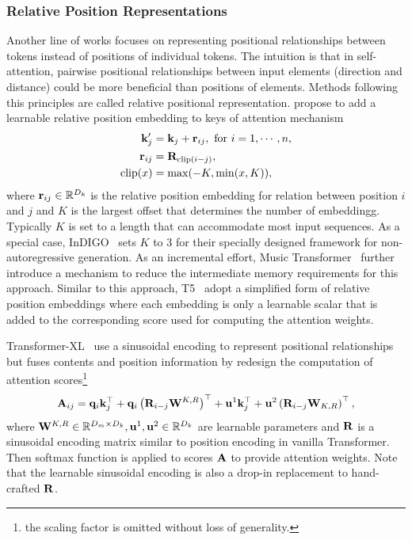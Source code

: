 \documentclass[manuscript,acmsmall,screen,nonacm]{acmart}
\theoremstyle{definition}
\begin{document}
\subsubsection{Relative Position Representations}

Another line of works focuses on representing positional relationships between tokens instead of positions of individual tokens. The intuition is that in self-attention, pairwise positional relationships between input elements (direction and distance) could be more beneficial than positions of elements. Methods following this principles are called relative positional representation. \citet{shaw2018relative} propose to add a learnable relative position embedding to keys of attention mechanism
\begin{align}
    \mathbf{k}_j' &= \mathbf{k}_j + \mathbf{r}_{ij},\ \text{for }i=1,\cdots, n,\\
    \mathbf{r}_{ij} &= \mathbf{R}_{\mathrm{clip}(i-j)}\label{rij},\\
    \mathrm{clip}(x) &= \max(-K, \min(x, K))\label{eq:shaw_clip},
\end{align}
where $\mathbf{r}_{ij}\in\mathbb{R}^{D_k}$ is the relative position embedding for relation between position $i$ and $j$ and $K$ is the largest offset that determines the number of embeddingg. Typically $K$ is set to a length that can accommodate most input sequences. As a special case, InDIGO~\cite{gu19indigo} sets $K$ to $3$ for their specially designed framework for non-autoregressive generation. As an incremental effort, Music Transformer~\cite{huang2018music} further introduce a mechanism to reduce the intermediate memory requirements for this approach. Similar to this approach, T5~\citet{raffel2020t5} adopt a simplified form of relative position embeddings where each embedding is only a learnable scalar that is added to the corresponding score used for computing the attention weights.

Transformer-XL~\cite{dai2019transformerxl} use a sinusoidal encoding to represent positional relationships but fuses contents and position information by redesign the computation of attention scores\footnote{the scaling factor is omitted without loss of generality.}
\begin{equation}
    \mathbf{A}_{ij}=\mathbf{q}_i \mathbf{k}_j^\top+\mathbf{q}_i\left(\mathbf{R}_{i-j}\mathbf{W}^{K,R}\right)^\top +\mathbf{u}^1\mathbf{k}_j^\top+\mathbf{u}^2\left(\mathbf{R}_{i-j}\mathbf{W}_{K,R}\right)^\top,
\end{equation}
where $\mathbf{W}^{K,R}\in\mathbb{R}^{D_m\times D_k},\mathbf{u}^1,\mathbf{u}^2\in\mathbb{R}^{D_k}$ are learnable parameters and $\mathbf{R}$ is a sinusoidal encoding matrix similar to position encoding in vanilla Transformer. Then softmax function is applied to scores $\mathbf{A}$ to provide attention weights. Note that the learnable sinusoidal encoding\cite{wang2021peonbert} is also a drop-in replacement to hand-crafted $\mathbf{R}$.
\end{document}
